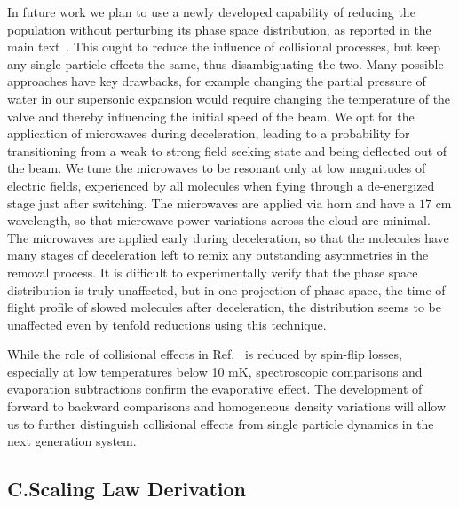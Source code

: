 \documentclass[%
 reprint,
 amsmath,amssymb,
 aps,
prl,
]{revtex4-1}
\begin{document}
In future work we plan to use a newly developed capability of reducing the population without perturbing its phase space distribution, as reported in the main text~\cite{smt}.
This ought to reduce the influence of collisional processes, but keep any single particle effects the same, thus disambiguating the two.
Many possible approaches have key drawbacks, for example changing the partial pressure of water in our supersonic expansion would require changing the temperature of the valve and thereby influencing the initial speed of the beam. 
We opt for the application of microwaves during deceleration, leading to a probability for transitioning from a weak to strong field seeking state and being deflected out of the beam.
We tune the microwaves to be resonant only at low magnitudes of electric fields, experienced by all molecules when flying through a de-energized stage just after switching.
The microwaves are applied via horn and have a $17\text{ cm}$ wavelength, so that microwave power variations across the cloud are minimal.
The microwaves are applied early during deceleration, so that the molecules have many stages of deceleration left to remix any outstanding asymmetries in the removal process.
It is difficult to experimentally verify that the phase space distribution is truly unaffected, but in one projection of phase space, the time of flight profile of slowed molecules after deceleration, the distribution seems to be unaffected even by tenfold reductions using this technique.

While the role of collisional effects in Ref.~\cite{Stuhl2012evap} is reduced by spin-flip losses, especially at low temperatures below 10 mK, spectroscopic comparisons and evaporation subtractions confirm the evaporative effect. The development of forward to backward comparisons and homogeneous density variations will allow us to further distinguish collisional effects from single particle dynamics in the next generation system.

\subsection{C.\quad Scaling Law Derivation\label{sec:der}}
\end{document}
